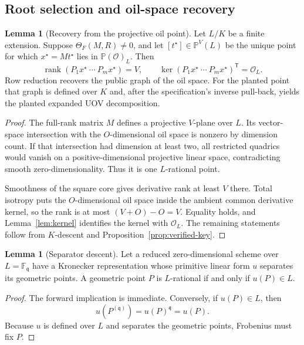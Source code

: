 \documentclass[11pt,a4paper]{article}
\theoremstyle{definition}
\newtheorem{lemma}[theorem]{Lemma}
\theoremstyle{remark}
\newcommand{\F}{\mathbb F}
\newcommand{\PP}{\mathbb P}
\newcommand{\cO}{\mathcal O}
\newcommand{\rank}{\operatorname{rank}}
\begin{document}
\subsection{Root selection and oil-space recovery}\label{subsec:root-recovery}

\begin{lemma}[Recovery from the projective oil point]\label{lem:descent}
Let $L/K$ be a finite extension.  Suppose $\Theta_F(M,R)\ne0$, and let $[t^\star]\in\PP^V(L)$ be the unique point for which $x^\star=Mt^\star$ lies in $\PP(\cO)_L$.  Then
\[
\rank(P_1x^\star\ \cdots\ P_mx^\star)=V,
\qquad
\ker(P_1x^\star\ \cdots\ P_mx^\star)^{\mathsf T}=\cO_L.
\]
Row reduction recovers the public graph of the oil space.  For the planted point that graph is defined over $K$ and, after the specification's inverse pull-back, yields the planted expanded UOV decomposition.
\end{lemma}

\begin{proof}
The full-rank matrix $M$ defines a projective $V$-plane over $L$.  Its vector-space intersection with the $O$-dimensional oil space is nonzero by dimension count.  If that intersection had dimension at least two, all restricted quadrics would vanish on a positive-dimensional projective linear space, contradicting smooth zero-dimensionality.  Thus it is one $L$-rational point.

Smoothness of the square core gives derivative rank at least $V$ there.  Total isotropy puts the $O$-dimensional oil space inside the ambient common derivative kernel, so the rank is at most $(V+O)-O=V$.  Equality holds, and Lemma~\ref{lem:kernel} identifies the kernel with $\cO_L$.  The remaining statements follow from $K$-descent and Proposition~\ref{prop:verified-key}.
\end{proof}

\begin{lemma}[Separator descent]\label{lem:separator-descent}
Let a reduced zero-dimensional scheme over $L=\F_{\mathfrak q}$ have a Kronecker representation whose primitive linear form $u$ separates its geometric points.  A geometric point $P$ is $L$-rational if and only if $u(P)\in L$.
\end{lemma}

\begin{proof}
The forward implication is immediate.  Conversely, if $u(P)\in L$, then
\[
u(P^{(\mathfrak q)})=u(P)^{\mathfrak q}=u(P).
\]
Because $u$ is defined over $L$ and separates the geometric points, Frobenius must fix $P$.
\end{proof}
\end{document}
